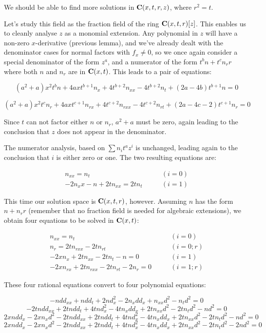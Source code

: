 \documentclass{article}
\newcommand{\C}{\ensuremath{{\bf C}}}
\begin{document}
We should be able to find more solutions in $\C(x,t,r,z)$, where $r^2=t$.

Let's study this field as the fraction field of the ring
$\C(x,t,r)[z]$.  This enables us to cleanly analyse $z$ as a monomial
extension.  Any polynomial in $z$ will have a non-zero $x$-derivative
(previous lemma), and we've already dealt with the denominator cases for
normal factors with $f_x \ne 0$, so we once again consider a special
denominator of the form $z^a$, and a numerator of the form $t^b n +
t^c n_r r$ where both $n$ and $n_r$ are in $\C(x,t)$.  This leads
to a pair of equations:

$$(a^{2} +a)x^{2}t^{b}n +4axt^{b +1}n_{x} +4t^{b +2}n_{xx} -4t^{b +2}n_{t} +(2a -4b)t^{b +1}n = 0$$

$$(a^{2} +a)x^{2}t^{c}n_r +4axt^{c +1}n_{rx} +4t^{c +2}n_{rxx} -4t^{c +2}n_{rt} +(2a -4c -2)t^{c +1}n_r = 0$$

Since $t$ can not factor either $n$ or $n_r$, $a^2+a$ must be zero, again
leading to the conclusion that $z$ does not appear in the denominator.

The numerator analysis, based on $\sum n_i t^a z^i$ is unchanged, leading
again to the conclusion that $i$ is either zero or one.  The two resulting
equations are:

\begin{align*}
n_{xx} = n_t   & \qquad (i=0) \\
-2n_x x - n + 2 t n_{xx} = 2 t n_t  &  \qquad (i=1)
\end{align*}

This time our solution space is $\C(x,t,r)$, however.  Assuming $n$
has the form $n + n_r r$ (remember that no fraction field is needed
for algebraic extensions), we obtain four equations to be solved in $\C(x,t)$:

\begin{align*}
n_{xx} = n_t  & \qquad (i=0) \\
n_r = 2tn_{rxx} -2tn_{rt} & \qquad (i=0; r) \\
-2xn_{x} +2tn_{xx} -2tn_{t} -n = 0 & \qquad (i=1) \\
-2xn_{rx} +2tn_{rxx} -2tn_{rt} -2n_r = 0 & \qquad (i=1; r)
\end{align*}

These four rational equations convert to four polynomial equations:

$$-ndd_{xx} +ndd_t +2nd_x^{2} -2n_xdd_x +n_{xx}d^{2} -n_td^{2} = 0$$
$$-2tndd_{xx} +2tndd_t +4tnd_x^{2} -4tn_xdd_x +2tn_{xx}d^{2} -2tn_td^{2} -nd^{2} = 0$$
$$2xndd_x -2xn_xd^{2} -2tndd_{xx} +2tndd_t +4tnd_x^{2} -4tn_xdd_x +2tn_{xx}d^{2} -2tn_td^{2} -nd^{2} = 0$$
$$2xndd_x -2xn_xd^{2} -2tndd_{xx} +2tndd_t +4tnd_x^{2} -4tn_xdd_x +2tn_{xx}d^{2} -2tn_td^{2} -2nd^{2} = 0$$
\end{document}
